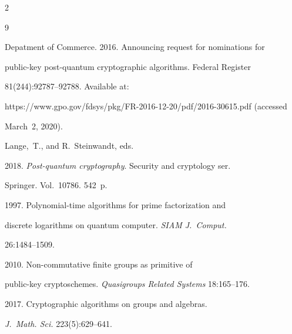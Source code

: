   \begin{multicols}{2}





\renewcommand{\bibname}{\protect\rmfamily References}







{\small\frenchspacing


 {%




 \begin{thebibliography}{9}




 Depatment of Commerce. 2016. Announcing request for nominations for 


 public-key post-quantum cryptographic algorithms. Federal Register 


81(244):92787--92788. Available at: 


{\sf https://www.gpo.gov/fdsys/pkg/FR-2016-12-20/pdf/2016-30615.pdf} (accessed 


March~2, 2020).




Lange,~T., and R.~Steinwandt, eds.


2018. \textit{Post-quantum cryptography}. Security and cryptology ser.


Springer. Vol.~10786. 542~p.




 1997. Polynomial-time algorithms for prime factorization and 


discrete logarithms on quantum computer. \textit{SIAM J.~Comput.} 


26:1484--1509.




 2010. Non-commutative finite groups as primitive of 


public-key cryptoschemes. \textit{Quasigroups Related Systems} 18:165--176.




 2017. Cryptographic algorithms on groups and algebras. 


\textit{J.~Math. Sci.} 223(5):629--641.


 \end{thebibliography}





 }


 }





\end{multicols}






